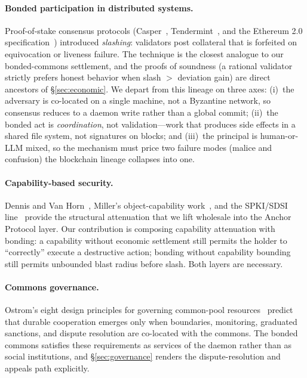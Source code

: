 \documentclass[11pt,a4paper]{article}
\theoremstyle{definition}
\theoremstyle{remark}
\begin{document}
\paragraph{Bonded participation in distributed systems.} Proof-of-stake consensus protocols (Casper~\cite{buterin2017casper}, Tendermint~\cite{buchman2016tendermint}, and the Ethereum 2.0 specification~\cite{ethereum2spec}) introduced \emph{slashing}: validators post collateral that is forfeited on equivocation or liveness failure. The technique is the closest analogue to our bonded-commons settlement, and the proofs of soundness (a rational validator strictly prefers honest behavior when slash $>$ deviation gain) are direct ancestors of \S\ref{sec:economic}. We depart from this lineage on three axes: (i)~the adversary is co-located on a single machine, not a Byzantine network, so consensus reduces to a daemon write rather than a global commit; (ii)~the bonded act is \emph{coordination}, not validation---work that produces side effects in a shared file system, not signatures on blocks; and (iii)~the principal is human-or-LLM mixed, so the mechanism must price two failure modes (malice and confusion) the blockchain lineage collapses into one.

\paragraph{Capability-based security.} Dennis and Van Horn~\cite{dennis1966programming}, Miller's object-capability work~\cite{miller2006robust}, and the SPKI/SDSI line~\cite{ellison1999spki} provide the structural attenuation that we lift wholesale into the Anchor Protocol layer. Our contribution is composing capability attenuation with bonding: a capability without economic settlement still permits the holder to ``correctly'' execute a destructive action; bonding without capability bounding still permits unbounded blast radius before slash. Both layers are necessary.

\paragraph{Commons governance.} Ostrom's eight design principles for governing common-pool resources~\cite{ostrom1990governing} predict that durable cooperation emerges only when boundaries, monitoring, graduated sanctions, and dispute resolution are co-located with the commons. The bonded commons satisfies these requirements as services of the daemon rather than as social institutions, and \S\ref{sec:governance} renders the dispute-resolution and appeals path explicitly.
\end{document}
